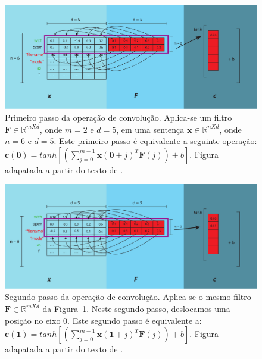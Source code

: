 \begin{figure}[h]
    \centering
    \includegraphics[width=1\textwidth]{figuras/cap-problema/first-step-convolution.pdf}
    \caption[Primeiro passo da operação de convolução.]{Primeiro passo da operação de convolução. Aplica-se um filtro $\bm{F} \in \mathbb{R}^{m X d}$, onde $m = 2$ e $d = 5$, em uma sentença $\bm{x} \in \mathbb{R}^{n X d}$, onde $n = 6$ e $d = 5$. Este primeiro passo é equivalente a seguinte operação: $\bm{c}(\bm{0}) = tanh \left[\left(\sum_{j=0}^{m - 1} \bm{x}(\bm{0} + j)^{T}\bm{F}(j)\right) + b\right]$. Figura adapatada a partir do texto de \cite{joshua-kim-cnn-understanding-word-embeddings-2019}.} 
    \label{fig:first-step-convolutional}
\end{figure}

\begin{figure}[h]
    \centering
    \includegraphics[width=1\textwidth]{figuras/cap-problema/second-step-convolution.pdf}
    \caption[Segundo passo da operação de convolução.]{Segundo passo da operação de convolução. Aplica-se o mesmo filtro $\bm{F} \in \mathbb{R}^{m X d}$ da Figura~\ref{fig:first-step-convolutional}. Neste segundo passo, deslocamos uma posição no eixo $0$. Este segundo passo é equivalente a: $\bm{c}(\bm{1}) = tanh [(\sum_{j=0}^{m - 1} \bm{x}(\bm{1} + j)^{T}\bm{F}(j)) + b]$. Figura adapatada a partir do texto de \cite{joshua-kim-cnn-understanding-word-embeddings-2019}.}
    \label{fig:second-step-convolutional}
\end{figure}


